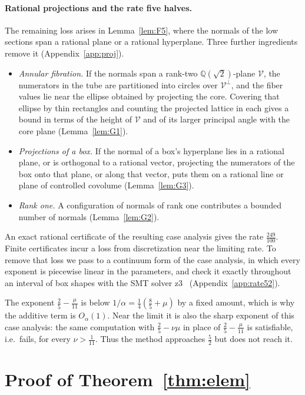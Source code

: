 \documentclass[aps,prx,twocolumn,superscriptaddress,nofootinbib,longbibliography]{revtex4-2}
\theoremstyle{plain}
\theoremstyle{definition}
\theoremstyle{remark}
\newcommand{\Q}{\mathbb{Q}}
\begin{document}
\paragraph{Rational projections and the rate five halves.} The remaining loss arises in Lemma~\ref{lem:F5}, where the normals of the low sections span a rational plane or a rational hyperplane. Three further ingredients remove it (Appendix~\ref{app:proj}).
\begin{itemize}
\item \emph{Annular fibration.} If the normals span a rank-two $\Q(\sqrt2)$-plane $\mathcal V$, the numerators in the tube are partitioned into circles over $\mathcal V^\perp$, and the fiber values lie near the ellipse obtained by projecting the core. Covering that ellipse by thin rectangles and counting the projected lattice in each gives a bound in terms of the height of $\mathcal V$ and of its larger principal angle with the core plane (Lemma~\ref{lem:G1}).
\item \emph{Projections of a box.} If the normal of a box's hyperplane lies in a rational plane, or is orthogonal to a rational vector, projecting the numerators of the box onto that plane, or along that vector, puts them on a rational line or plane of controlled covolume (Lemma~\ref{lem:G3}).
\item \emph{Rank one.} A configuration of normals of rank one contributes a bounded number of normals (Lemma~\ref{lem:G2}).
\end{itemize}
An exact rational certificate of the resulting case analysis gives the rate $\tfrac{249}{100}$. Finite certificates incur a loss from discretization near the limiting rate. To remove that loss we pass to a continuum form of the case analysis, in which every exponent is piecewise linear in the parameters, and check it exactly throughout an interval of box shapes with the SMT solver z3~\cite{Z3} (Appendix~\ref{app:rate52}).

The exponent $\tfrac25-\tfrac\mu{11}$ is below $1/\alpha=\tfrac14(\tfrac85+\mu)$ by a fixed amount, which is why the additive term is $O_\alpha(1)$. Near the limit it is also the sharp exponent of this case analysis: the same computation with $\tfrac25-\nu\mu$ in place of $\tfrac25-\tfrac\mu{11}$ is satisfiable, i.e.\ fails, for every $\nu>\tfrac1{11}$. Thus the method approaches $\tfrac52$ but does not reach it.

\section{Proof of Theorem~\ref{thm:elem}}\label{app:elem}
\end{document}
